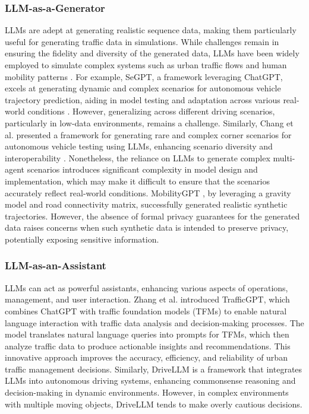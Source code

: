 \subsubsection{LLM-as-a-Generator}  
LLMs are adept at generating realistic sequence data, making them particularly useful for generating traffic data in simulations. While challenges remain in ensuring the fidelity and diversity of the generated data, LLMs have been widely employed to simulate complex systems such as urban traffic flows and human mobility patterns \cite{long2024llms}. For example, SeGPT, a framework leveraging ChatGPT, excels at generating dynamic and complex scenarios for autonomous vehicle trajectory prediction, aiding in model testing and adaptation across various real-world conditions \cite{li2024chatgpt}. However, generalizing across different driving scenarios, particularly in low-data environments, remains a challenge. Similarly, Chang et al. presented a framework for generating rare and complex corner scenarios for autonomous vehicle testing using LLMs, enhancing scenario diversity and interoperability \cite{chang2024llmscenario}. Nonetheless, the reliance on LLMs to generate complex multi-agent scenarios introduces significant complexity in model design and implementation, which may make it difficult to ensure that the scenarios accurately reflect real-world conditions. MobilityGPT \cite{haydari2024mobilitygpt}, by leveraging a gravity model and road connectivity matrix, successfully generated realistic synthetic trajectories. However, the absence of formal privacy guarantees for the generated data raises concerns when such synthetic data is intended to preserve privacy, potentially exposing sensitive information.

\subsubsection{LLM-as-an-Assistant}  
LLMs can act as powerful assistants, enhancing various aspects of operations, management, and user interaction. Zhang et al. \cite{zhang2024trafficgpt} introduced TrafficGPT, which combines ChatGPT with traffic foundation models (TFMs) to enable natural language interaction with traffic data analysis and decision-making processes. The model translates natural language queries into prompts for TFMs, which then analyze traffic data to produce actionable insights and recommendations. This innovative approach improves the accuracy, efficiency, and reliability of urban traffic management decisions. Similarly, DriveLLM \cite{cui2023drivellm} is a framework that integrates LLMs into autonomous driving systems, enhancing commonsense reasoning and decision-making in dynamic environments. However, in complex environments with multiple moving objects, DriveLLM tends to make overly cautious decisions.

